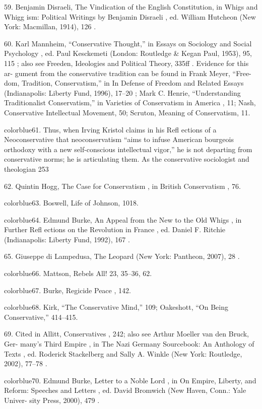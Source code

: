 	{\color{blue}59}. Benjamin Disraeli, The Vindication of the English Constitution, in Whigs and Whigg ism: Political Writings by Benjamin Disraeli , ed. William Hutcheon (New York: Macmillan, 1914), 126 .


	{\color{blue}60}. Karl Mannheim, “Conservative Thought,” in Essays on Sociology and Social Psychology , ed. Paul Kesckemeti (London: Routledge & Kegan Paul, 1953), 95, 115 ; also see Freeden, Ideologies and Political Theory, 335ff . Evidence for this ar- gument from the conservative tradition can be found in Frank Meyer, “Free- dom, Tradition, Conservatism,” in In Defense of Freedom and Related Essays (Indianapolis: Liberty Fund, 1996), 17–20 ; Mark C. Henrie, “Understanding Traditionalist Conservatism,” in Varieties of Conservatism in America , 11; Nash, Conservative Intellectual Movement, 50; Scruton, Meaning of Conservatism, 11.


	{color{blue}61}. Thus, when Irving Kristol claims in his Refl ections of a Neoconservative that neoconservatism “aims to infuse American bourgeois orthodoxy with a new self-conscious intellectual vigor,” he is not departing from conservative norms; he is articulating them. As the conservative sociologist and theologian 253


	{\color{blue}62}. Quintin Hogg, The Case for Conservatism , in British Conservatism , 76.


	{color{blue}63}. Boswell, Life of Johnson, 1018.


	{color{blue}64}. Edmund Burke, An Appeal from the New to the Old Whigs , in Further Refl ections on the Revolution in France , ed. Daniel F. Ritchie (Indianapolis: Liberty Fund, 1992), 167 .


	{\color{blue}65}. Giuseppe di Lampedusa, The Leopard (New York: Pantheon, 2007), 28 .


	{color{blue}66}. Mattson, Rebels All! 23, 35–36, 62.


	{color{blue}67}. Burke, Regicide Peace , 142.


	{color{blue}68}. Kirk, “The Conservative Mind,” 109; Oakeshott, “On Being Conservative,” 414–415.


	{\color{blue}69}. Cited in Allitt, Conservatives , 242; also see Arthur Moeller van den Bruck, Ger- many’s Third Empire , in The Nazi Germany Sourcebook: An Anthology of Texts , ed. Roderick Stackelberg and Sally A. Winkle (New York: Routledge, 2002), 77–78 .


	{color{blue}70}. Edmund Burke, Letter to a Noble Lord , in On Empire, Liberty, and Reform: Speeches and Letters , ed. David Bromwich (New Haven, Conn.: Yale Univer- sity Press, 2000), 479 .


